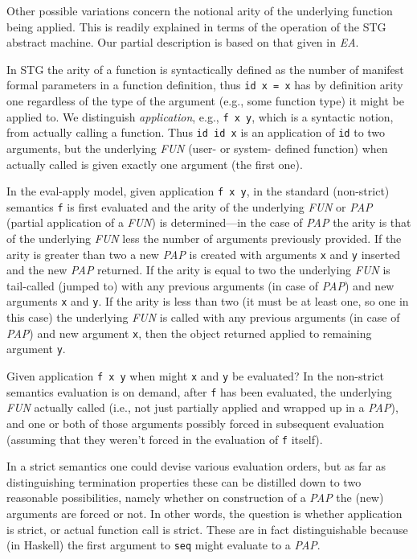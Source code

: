 \documentclass{llncs}
\begin{document}
Other possible variations concern the notional arity of the underlying
function being applied.  This is readily explained in terms of the operation
of the STG abstract machine.  Our partial description is based on that given
in \emph{EA}.

In STG the arity of a function is syntactically defined as the number of
manifest formal parameters in a function definition, thus \texttt{id x = x}
has by definition arity one regardless of the type of the argument (e.g., some
function type) it might be applied to.  We distinguish \emph{application},
e.g., \texttt{f x y}, which is a syntactic notion, from actually calling a
function. Thus \texttt{id id x} is an application of \texttt{id} to two
arguments, but the underlying \emph{FUN} (user- or system- defined function)
when actually called is given exactly one argument (the first one).

In the eval-apply model, given application \texttt{f x y}, in the standard
(non-strict) semantics \texttt{f} is first evaluated and the arity of the
underlying \emph{FUN} or \emph{PAP} (partial application of a \emph{FUN}) is
determined---in the case of \emph{PAP} the arity is that of the underlying
\emph{FUN} less the number of arguments previously provided.  If the arity is
greater than two a new \emph{PAP} is created with arguments \texttt{x} and
\texttt{y} inserted and the new \emph{PAP} returned.  If the arity is equal to
two the underlying \emph{FUN} is tail-called (jumped to) with any previous
arguments (in case of \emph{PAP}) and new arguments \texttt{x} and \texttt{y}.
If the arity is less than two (it must be at least one, so one in this case)
the underlying \emph{FUN} is called with any previous arguments (in case of
\emph{PAP}) and new argument \texttt{x}, then the object returned applied to
remaining argument \texttt{y}.

Given application \texttt{f x y} when might \texttt{x} and \texttt{y} be
evaluated?  In the non-strict semantics evaluation is on demand, after
\texttt{f} has been evaluated, the underlying \emph{FUN} actually called
(i.e., not just partially applied and wrapped up in a \emph{PAP}), and one or
both of those arguments possibly forced in subsequent evaluation (assuming
that they weren't forced in the evaluation of \texttt{f} itself).

In a strict semantics one could devise various evaluation orders, but as far
as distinguishing termination properties these can be distilled down to two
reasonable possibilities, namely whether on construction of a \emph{PAP} the
(new) arguments are forced or not.  In other words, the question is whether
application is strict, or actual function call is strict.  These are in fact
distinguishable because (in Haskell) the first argument to \texttt{seq} might
evaluate to a \emph{PAP}.
\end{document}
